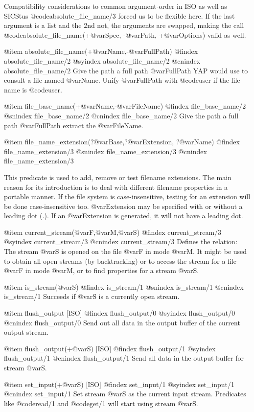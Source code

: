{{{{{Compatibility considerations to common argument-order in ISO as well
as SICStus @code{absolute_file_name/3} forced us to be flexible here.
If the last argument is a list and the 2nd not, the arguments are
swapped, making the call @code{absolute_file_name}(+@var{Spec}, -@var{Path},
+@var{Options}) valid as well.

@item absolute_file_name(+@var{Name},-@var{FullPath})
@findex absolute_file_name/2
@syindex absolute_file_name/2
@cnindex absolute_file_name/2
Give the path a full path @var{FullPath} YAP would use to consult a file
named @var{Name}.  Unify @var{FullPath} with @code{user} if the file
name is @code{user}.

@item file_base_name(+@var{Name},-@var{FileName})
@findex file_base_name/2
@snindex file_base_name/2
@cnindex file_base_name/2
Give the path a full path @var{FullPath} extract the @var{FileName}.

@item file_name_extension(?@var{Base},?@var{Extension}, ?@var{Name})
@findex file_name_extension/3
@snindex file_name_extension/3
@cnindex file_name_extension/3

This predicate is used to add, remove or test filename extensions. The
main reason for its introduction is to deal with different filename
properties in a portable manner. If the file system is
case-insensitive, testing for an extension will be done
case-insensitive too. @var{Extension} may be specified with or
without a leading dot (.). If an @var{Extension} is generated, it
will not have a leading dot.

@item current_stream(@var{F},@var{M},@var{S})
@findex current_stream/3
@syindex current_stream/3
@cnindex current_stream/3
Defines the relation: The stream @var{S} is opened on the file @var{F}
in mode @var{M}. It might be used to obtain all open streams (by
backtracking) or to access the stream for a file @var{F} in mode
@var{M}, or to find properties for a stream @var{S}.

@item is_stream(@var{S})
@findex is_stream/1
@snindex is_stream/1
@cnindex is_stream/1
Succeeds if @var{S} is a currently open stream.

@item flush_output [ISO]
@findex flush_output/0
@syindex flush_output/0
@cnindex flush_output/0
Send out all data in the output buffer of the current output stream.

@item flush_output(+@var{S}) [ISO]
@findex flush_output/1
@syindex flush_output/1
@cnindex flush_output/1
Send all data in the output buffer for stream @var{S}.

@item set_input(+@var{S}) [ISO]
@findex set_input/1
@syindex set_input/1
@cnindex set_input/1
Set stream @var{S} as the current input stream. Predicates like @code{read/1}
and @code{get/1} will start using stream @var{S}.

}}}}}
